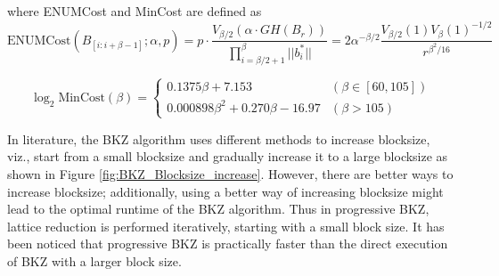 where ENUMCost and MinCost are defined as
\begin{equation*}
    \text{ENUMCost}(B_{[i:i+\beta-1]};\alpha,p)= p \cdot \frac{V_{\beta/2}(\alpha \cdot GH(B_r))}{\prod_{i=\beta/2+1}^{\beta} ||b_i^*||}=2 \alpha^{-\beta/2} \frac{V_{\beta/2}(1)V_{\beta}(1)^{-1/2}}{r^{\beta^2/16}}
\end{equation*}

\begin{equation*}
    \log_2{\text{MinCost}}(\beta) =
    \begin{cases}
        0.1375 \beta + 7.153                  & (\beta \in [60, 105]) \\
        0.000898 \beta^2 + 0.270\beta - 16.97 & (\beta > 105)
    \end{cases}
\end{equation*}







In literature, the BKZ algorithm uses different methods to increase blocksize, viz., start from a small blocksize and gradually increase it to a large blocksize as shown in Figure \ref{fig:BKZ_Blocksize_increase}.
However, there are better ways to increase blocksize; additionally, using a better way of increasing blocksize might lead to the optimal runtime of the BKZ algorithm.
Thus in progressive BKZ, lattice reduction is performed iteratively, starting with a small block size.
It has been noticed that progressive BKZ is practically faster than the direct execution of BKZ with a larger block size.


